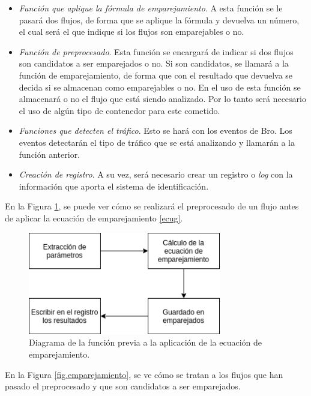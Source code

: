 \begin{itemize}
\item \textit{Función que aplique la fórmula de emparejamiento}. 
\intro A esta función se le pasará dos flujos, de forma que se aplique la fórmula y devuelva un número, el cual 
será el que indique si los flujos son emparejables o no.
\item \textit{Función de preprocesado}. 
\intro Esta función se encargará de indicar si dos flujos son candidatos a ser emparejados o no. Si son candidatos, se llamará a la función de emparejamiento, de forma que con el resultado que devuelva se decida si se almacenan como emparejables o no.
\intro En el uso de esta función se almacenará o no el flujo que está siendo analizado. Por lo tanto será necesario el uso de algún tipo de contenedor para este cometido.
\item \textit{Funciones que detecten el tráfico}. 
\intro Esto se hará con los eventos de Bro. Los eventos detectarán el tipo de tráfico que se está analizando y llamarán a la función 
anterior.
\item \textit{Creación de registro}.
\intro A su vez, será necesario crear un registro o \textit{log} con la información que aporta el sistema de identificación.
\end{itemize}

\intro En la Figura \ref{fig.calculo}, se puede ver cómo se realizará el preprocesado de un flujo antes de aplicar la ecuación de emparejamiento \ref{ecug}.

\begin{figure}[H]
  \includegraphics[width=0.75\textwidth]{imagenes/calculo.png}
  \centering
  \caption{Diagrama de la función previa a la aplicación de la ecuación de emparejamiento.}\label{fig.calculo}
\end{figure}

\intro En la Figura \ref{fig.emparejamiento}, se ve cómo se tratan a los flujos que han pasado el preprocesado y que son candidatos a ser emparejados.


